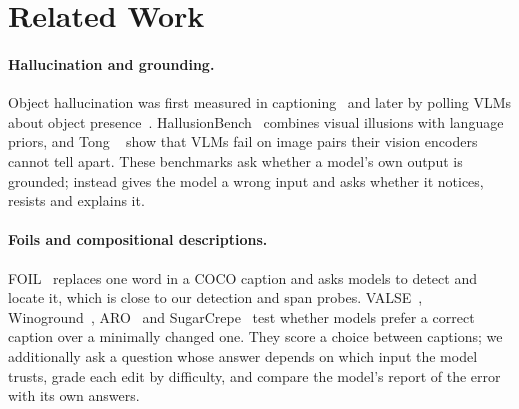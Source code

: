 \section{Related Work}
\label{sec:related}

\paragraph{Hallucination and grounding.}
Object hallucination was first measured in captioning~\cite{rohrbach2018object} and later by polling VLMs about object presence~\cite{li2023pope}. HallusionBench~\cite{guan2024hallusionbench} combines visual illusions with language priors, and Tong \etal~\cite{tong2024eyes} show that VLMs fail on image pairs their vision encoders cannot tell apart. These benchmarks ask whether a model's own output is grounded; \name instead gives the model a wrong input and asks whether it notices, resists and explains it.

\paragraph{Foils and compositional descriptions.}
FOIL~\cite{shekhar2017foil} replaces one word in a COCO caption and asks models to detect and locate it, which is close to our detection and span probes. VALSE~\cite{parcalabescu2022valse}, Winoground~\cite{thrush2022winoground}, ARO~\cite{yuksekgonul2023bags} and SugarCrepe~\cite{hsieh2023sugarcrepe} test whether models prefer a correct caption over a minimally changed one. They score a choice between captions; we additionally ask a question whose answer depends on which input the model trusts, grade each edit by difficulty, and compare the model's report of the error with its own answers.

